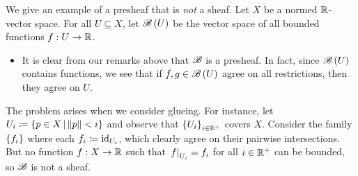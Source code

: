 \documentclass[../Moduli_Spaces_of_Riemann_Surfaces.tex]{subfiles}
\begin{document}
    \vspace{-0.05in}
    \begin{example}
        We give an example of a presheaf that is \textit{not} a sheaf. Let $X$ be a normed $\mathbb{R}$-vector space. For all $U\subseteq X$, let $\mathscr{B}\left(U\right)$ be the vector space of all bounded functions $f:U\to\mathbb{R}$.
        \begin{itemize}
            \item It is clear from our remarks above that $\mathscr{B}$ is a presheaf. In fact, since $\mathscr{B}\left(U\right)$ contains functions, we see that if $f,g\in\mathscr{B}\left(U\right)$ agree on all restrictions, then they agree on $U$.
        \end{itemize}
        The problem arises when we consider glueing. For instance, let $U_i\coloneqq\left\{p\in X\,\middle\vert\,\left\|p\right\|<i\right\}$ and observe that $\left\{U_i\right\}_{i\in\mathbb{R}^+}$ covers $X$. Consider the family $\left\{f_i\right\}$ where each $f_i\coloneqq\operatorname{id}_{U_i}$, which clearly agree on their pairwise intersections. But no function $f:X\to\mathbb{R}$ such that $\left.f\right|_{U_i}=f_i$ for all $i\in\mathbb{R}^+$ can be bounded, so $\mathscr{B}$ is not a sheaf.\exqed
    \end{example}
\end{document}
